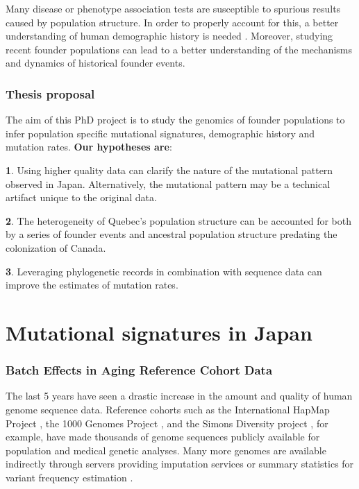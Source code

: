 \documentclass[
11pt, %
oneside, %
english, %
doublespacing, %
headsepline, %
chapterinoneline, %
]{MastersDoctoralThesis} %
\begin{document}
Many disease or phenotype association tests are susceptible to spurious results caused by population structure.
In order to properly account for this, a better understanding of human demographic history is needed \citep{Gravel2011}.
Moreover, studying recent founder populations can lead to a better understanding of the mechanisms and dynamics of historical founder events. 

\subsection{Thesis proposal}
The aim of this PhD project is to study the genomics of founder populations to infer population specific mutational signatures, demographic history and mutation rates.
\textbf{Our hypotheses are}: 

\textbf{1}. Using higher quality data can clarify the nature of the mutational pattern observed in Japan. Alternatively, the mutational pattern may be a technical artifact unique to the original data.

\textbf{2}. The heterogeneity of Quebec's population structure can be accounted for both by a series of founder events and ancestral population structure predating the colonization of Canada.

\textbf{3}. Leveraging phylogenetic records in combination with sequence data can improve the estimates of mutation rates.
\vfill
\restoregeometry 
\chapter{Mutational signatures in Japan}

\subsection{Batch Effects in Aging Reference Cohort Data}	
The last 5 years have seen a drastic increase in the amount and quality of human genome sequence data. 
Reference cohorts such as the International HapMap Project \citep{HapMap2005}, the 1000 Genomes Project \citep{1000GenomesProjectConsortium2010,The1000GenomesProjectConsortium2012}, and the Simons Diversity project \citep{Mallick2016}, for example, have made thousands of genome sequences publicly available for population and medical genetic analyses. 
Many more genomes are available indirectly through servers providing imputation services \citep{HapMap2005} or summary statistics for variant frequency estimation \citep{Lek2016}.
\end{document}
